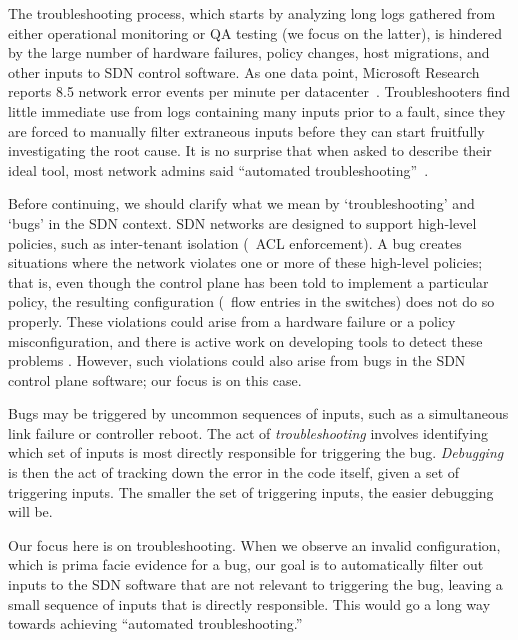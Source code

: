 The troubleshooting process, which starts by analyzing long logs gathered from either operational monitoring or QA testing
(we focus on the latter), is hindered by the large number of hardware failures,
policy changes, host migrations, and other inputs to SDN control software.
As one data point, Microsoft Research
reports 8.5 network error events per minute per
datacenter~\cite{Greenberg:2009:VSF:1592568.1592576}.
Troubleshooters find little immediate use from logs containing many inputs
prior to a fault,
since they are forced to manually filter extraneous inputs
before they can start fruitfully investigating the root cause.
It is no surprise that when asked to describe their
ideal tool, most network admins said ``automated troubleshooting''~\cite{Zeng:Survey}.


Before continuing, we should clarify what we mean by `troubleshooting' and `bugs' in the SDN context.
SDN networks are designed to support high-level policies, such as inter-tenant
isolation (\ie~ACL enforcement). A bug creates situations
where the network violates one or more of these high-level policies; that is, even though the control plane
has been told to implement a particular policy, the resulting configuration (\ie~flow entries in the switches)
does not do so properly. %
These violations could arise from a hardware failure or a policy misconfiguration, and there is active work on
developing tools to detect these problems \cite{hsa,Zeng:2012:ATP:2413176.2413205}. However, such violations
could also arise from bugs in the SDN control plane software; our focus is on
this case.

Bugs may be triggered by uncommon sequences of inputs, such as a simultaneous link failure or controller reboot.
The act of {\em troubleshooting} involves identifying which set of inputs is most directly responsible for triggering the bug.
{\em Debugging} is then the act of tracking down the error in the code itself, given a
set of triggering inputs.
The smaller the set of triggering inputs, the easier debugging will be.

Our focus here is on troubleshooting. When we observe an invalid
configuration,
which is prima facie evidence for a bug, our goal is
to automatically filter out inputs to the SDN software
that are not relevant to triggering the bug, leaving a small sequence of inputs
that is directly responsible.
This would go a long way towards achieving ``automated troubleshooting.''

